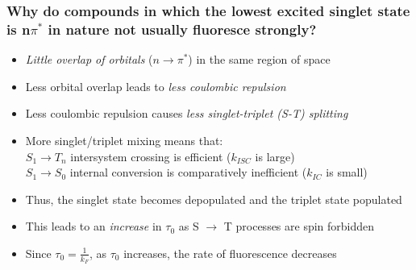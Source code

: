 \documentclass[a4paper,12pt,titlepage]{article}
\begin{document}
\begin{frame}
\frametitle{Why do compounds in which the lowest excited singlet state is n\(\pi^*\) in nature not usually fluoresce strongly?}
\begin{itemize}[<+->]
\item \emph{Little overlap of orbitals} (\(n \rightarrow \pi^*\)) in the same region of space
\item Less orbital overlap leads to \emph{less coulombic repulsion}
\item Less coulombic repulsion causes \emph{less singlet-triplet (S-T) splitting}
\item More singlet/triplet mixing means that:\\
\hspace{10pt} \(S_1 \rightarrow T_n\) intersystem crossing is efficient (\(k_{ISC}\) is large)\\
\hspace{10pt} \(S_1 \rightarrow S_0\) internal conversion is comparatively inefficient (\(k_{IC}\) is small)
\item Thus, the singlet state becomes depopulated and the triplet state populated
\item This leads to an \emph{increase} in \(\tau_0\) as S \(\rightarrow\) T processes are spin forbidden
\item Since \(\tau_0 = \frac{1}{k_F}\), as \(\tau_0\) increases, the rate of fluorescence decreases
\end{itemize}
\end{frame}
\end{document}
